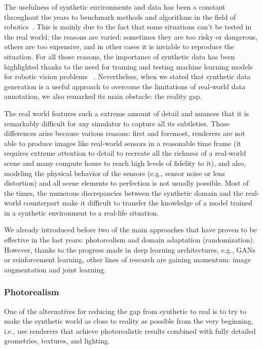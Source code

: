 The usefulness of synthetic environments and data has been a constant throughout the years to benchmark methods and algorithms in the field of robotics~\cite{Butler2012}. This is mainly due to the fact that some situations can't be tested in the real world; the reasons are varied: sometimes they are too risky or dangerous, others are too expensive, and in other cases it is inviable to reproduce the situation. For all those reasons, the importance of synthetic data has been highlighted thanks to the need for training and testing machine learning models for robotic vision problems~ \cite{Brodeur2017} \cite{Ros2016} \cite{Mahler2017dex}. Nevertheless, when we stated that synthetic data generation is a useful approach to overcome the limitations of real-world data annotation, we also remarked its main obstacle: the reality gap.

The real world features such a extreme amount of detail and nuances that it is remarkably difficult for any simulator to capture all its subtleties. Those differences arise because various reasons: first and foremost, renderers are not able to produce images like real-world sensors in a reasonable time frame (it requires extreme attention to detail to recreate all the richness of a real-world scene and many compute hours to reach high levels of fidelity to it), and also, modeling the physical behavior of the sensors (e.g., sensor noise or lens distortion) and all scene elements to perfection is not usually possible. Most of the times, the numerous discrepancies between the synthetic domain and the real-world counterpart make it difficult to transfer the knowledge of a model trained in a synthetic environment to a real-life situation.

We already introduced before two of the main approaches that have proven to be effective in the last years: photorealism and domain adaptation (randomization). However, thanks to the progress made in deep learning architectures, e.g., \acp{GAN} or reinforcement learning, other lines of research are gaining momentum: image augmentation and joint learning.

\subsubsection{Photorealism}

One of the alternatives for reducing the gap from synthetic to real is to try to make the synthetic world as close to reality as possible from the very beginning, i.e., use renderers that achieve photorealistic results combined with fully detailed geometries, textures, and lighting.

